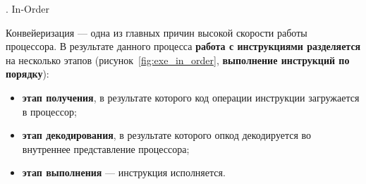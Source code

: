 \begin{frame}{\insertsubsubsection. In-Order}
{    Конвейеризация --- одна из главных причин высокой скорости работы
    процессора. В результате данного процесса \textbf{работа с инструкциями
      разделяется} на несколько этапов (рисунок \ref{fig:exe_in_order},
    \textbf{выполнение инструкций по порядку}):

    \begin{itemize}
    \item \textbf{этап получения}, в результате которого код операции инструкции
      загружается в процессор;

    \item \textbf{этап декодирования}, в результате которого опкод декодируется
      во внутреннее представление процессора;

    \item \textbf{этап выполнения} --- инструкция исполняется.
    \end{itemize}

  }
\end{frame}





